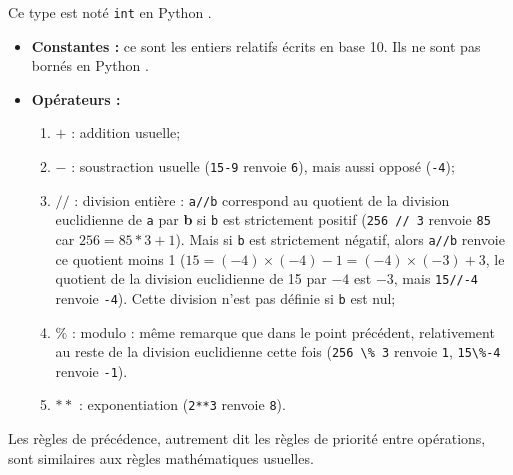 \begin{defi}[Entiers]
Ce type est noté \lstinline{int} en Python .\\
\begin{itemize}
\item \textbf{Constantes :} ce sont les entiers relatifs écrits en base 10. Ils ne sont pas 
bornés en Python .
\item \textbf{Opérateurs :}
\begin{enumerate}
 \item $+$ : addition usuelle;
 \item $-$ : soustraction usuelle (\lstinline{15-9} renvoie \lstinline{6}), mais aussi opposé (\lstinline{-4});
\item  $//$ : {division entière} : \lstinline{a//b} correspond au quotient de la 
division euclidienne de \lstinline{a} par \textbf{b} si \lstinline{b} est strictement positif 
(\lstinline{256 // 3} renvoie \lstinline{85} car $256 = 85*3 + 1$). Mais si \lstinline{b} est strictement 
négatif, alors \lstinline{a//b} renvoie ce quotient moins 1 ($15 = (-4)\times(-4)-1=(-4)\times(-3)+3$, 
le quotient de la division euclidienne de 15 par $-4$ est $-3$, mais \lstinline{15//-4} renvoie 
\lstinline{-4}). Cette division n'est pas définie si \lstinline{b} est nul;
\item $\%$ : {modulo} : même remarque que dans le point précédent, relativement au reste de la 
division euclidienne cette fois (\lstinline{256 \% 3} renvoie 
\lstinline{1}, \lstinline{15\%-4} renvoie \lstinline{-1}).
\item $**$ : exponentiation (\lstinline{2**3} renvoie \lstinline{8}).
\end{enumerate}
\end{itemize}
Les {règles de précédence}, autrement dit les règles de priorité entre opérations, sont 
similaires aux règles mathématiques usuelles.
\end{defi}
